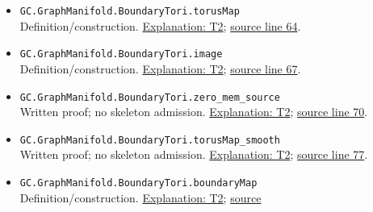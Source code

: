\documentclass[
  letterpaper,
  11pt]{article}
\begin{document}
\begin{itemize}
  \href{https://github.com/qinz1yang/differential-geometry-dev/blob/ea0fae60ee01ef8c8d9b57a51794c6538f679c5d/DifferentialGeometry/Topology/ThreeManifold/GraphManifold/Presentation.lean\#L55}{source
  line 55}.
\item
  {\small\texttt{GC.\allowbreak{}Graph\allowbreak{}Manifold.\allowbreak{}Boundary\allowbreak{}Tori.\allowbreak{}torus\allowbreak{}Map}}\\
  Definition/construction. \hyperref[t2]{Explanation: T2};
  \href{https://github.com/qinz1yang/differential-geometry-dev/blob/ea0fae60ee01ef8c8d9b57a51794c6538f679c5d/DifferentialGeometry/Topology/ThreeManifold/GraphManifold/Presentation.lean\#L64}{source
  line 64}.
\item
  {\small\texttt{GC.\allowbreak{}Graph\allowbreak{}Manifold.\allowbreak{}Boundary\allowbreak{}Tori.\allowbreak{}image}}\\
  Definition/construction. \hyperref[t2]{Explanation: T2};
  \href{https://github.com/qinz1yang/differential-geometry-dev/blob/ea0fae60ee01ef8c8d9b57a51794c6538f679c5d/DifferentialGeometry/Topology/ThreeManifold/GraphManifold/Presentation.lean\#L67}{source
  line 67}.
\item
  {\small\texttt{GC.\allowbreak{}Graph\allowbreak{}Manifold.\allowbreak{}Boundary\allowbreak{}Tori.\allowbreak{}zero\_\allowbreak{}mem\_\allowbreak{}source}}\\
  Written proof; no skeleton admission. \hyperref[t2]{Explanation: T2};
  \href{https://github.com/qinz1yang/differential-geometry-dev/blob/ea0fae60ee01ef8c8d9b57a51794c6538f679c5d/DifferentialGeometry/Topology/ThreeManifold/GraphManifold/Presentation.lean\#L70}{source
  line 70}.
\item
  {\small\texttt{GC.\allowbreak{}Graph\allowbreak{}Manifold.\allowbreak{}Boundary\allowbreak{}Tori.\allowbreak{}torus\allowbreak{}Map\_\allowbreak{}smooth}}\\
  Written proof; no skeleton admission. \hyperref[t2]{Explanation: T2};
  \href{https://github.com/qinz1yang/differential-geometry-dev/blob/ea0fae60ee01ef8c8d9b57a51794c6538f679c5d/DifferentialGeometry/Topology/ThreeManifold/GraphManifold/Presentation.lean\#L77}{source
  line 77}.
\item
  {\small\texttt{GC.\allowbreak{}Graph\allowbreak{}Manifold.\allowbreak{}Boundary\allowbreak{}Tori.\allowbreak{}boundary\allowbreak{}Map}}\\
  Definition/construction. \hyperref[t2]{Explanation: T2};
  \href{https://github.com/qinz1yang/differential-geometry-dev/blob/ea0fae60ee01ef8c8d9b57a51794c6538f679c5d/DifferentialGeometry/Topology/ThreeManifold/GraphManifold/Presentation.lean\#L82}{source
}
\end{itemize}
\end{document}
